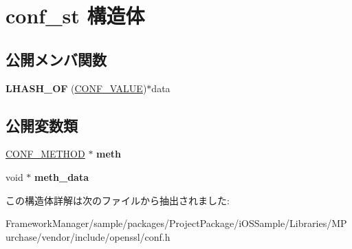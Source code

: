 \hypertarget{structconf__st}{}\section{conf\+\_\+st 構造体}
\label{structconf__st}
\subsection*{公開メンバ関数}
\begin{DoxyCompactItemize}
\item 
\hypertarget{structconf__st_ad6d8a78b1777539fb4b9ff154ec6bd75}{}{\bfseries L\+H\+A\+S\+H\+\_\+\+O\+F} (\hyperlink{struct_c_o_n_f___v_a_l_u_e}{C\+O\+N\+F\+\_\+\+V\+A\+L\+U\+E})$\ast$data\label{structconf__st_ad6d8a78b1777539fb4b9ff154ec6bd75}

\end{DoxyCompactItemize}
\subsection*{公開変数類}
\begin{DoxyCompactItemize}
\item 
\hypertarget{structconf__st_adfd637f9baf90803bf025f954be7c144}{}\hyperlink{structconf__method__st}{C\+O\+N\+F\+\_\+\+M\+E\+T\+H\+O\+D} $\ast$ {\bfseries meth}\label{structconf__st_adfd637f9baf90803bf025f954be7c144}

\item 
\hypertarget{structconf__st_aecc251d785e63628b7ad0f70fa9b6122}{}void $\ast$ {\bfseries meth\+\_\+data}\label{structconf__st_aecc251d785e63628b7ad0f70fa9b6122}

\end{DoxyCompactItemize}


この構造体詳解は次のファイルから抽出されました\+:\begin{DoxyCompactItemize}
\item 
Framework\+Manager/sample/packages/\+Project\+Package/i\+O\+S\+Sample/\+Libraries/\+M\+Purchase/vendor/include/openssl/conf.\+h\end{DoxyCompactItemize}
